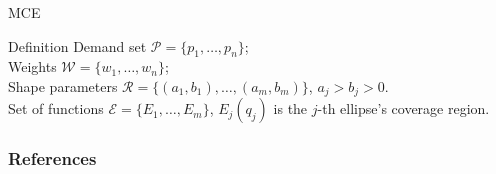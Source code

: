 \documentclass{beamer}
\newcommand{\Pp}{\mathscr{P}}
\newcommand{\E}{\mathscr{E}}
\newcommand{\Ww}{\mathscr{W}}
\newcommand{\Rr}{\mathscr{R}}
\begin{document}
\begin{frame}{MCE}
	\begin{block}{Definition}
		Demand set $\Pp=\{p_1, \dots, p_n\}$;\\
		Weights $\Ww = \{w_1, \dots, w_n\}$;\\
		Shape parameters $\Rr = \{(a_1, b_1), \dots, (a_m, b_m)\}$, $a_j > b_j > 0$.\\
		Set of functions $\E = \{E_1, \dots, E_m\}$, $E_j(q_j)$ is the $j$-th ellipse's coverage region.
	\end{block}
\end{frame}

\begin{frame}[allowframebreaks]
	\frametitle{References}
	
	
\end{frame}
	
\end{document}
